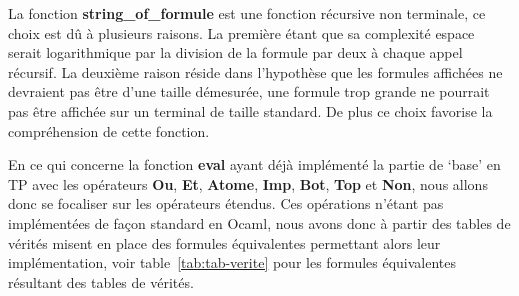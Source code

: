 \documentclass[12pt]{article}
\begin{document}
    \vphantom{}

    La fonction \textbf{string\_of\_formule} est une fonction récursive non 
    terminale, ce choix est dû à plusieurs raisons. La première étant que sa 
    complexité espace serait logarithmique par la division de la formule par 
    deux à chaque appel récursif. La deuxième raison réside dans l'hypothèse que
    les formules affichées ne devraient pas être d'une taille démesurée, une 
    formule trop grande ne pourrait pas être affichée sur un terminal de taille
    standard. De plus ce choix favorise la compréhension de cette fonction.

    \vphantom{}

    En ce qui concerne la fonction \textbf{eval} ayant déjà implémenté la
    partie de `base' en TP avec les opérateurs \textbf{Ou}, \textbf{Et}, 
    \textbf{Atome}, \textbf{Imp}, \textbf{Bot}, \textbf{Top} et \textbf{Non},
    nous allons donc se focaliser sur les opérateurs étendus. Ces opérations 
    n'étant pas implémentées de façon standard en Ocaml, nous avons donc à 
    partir des tables de vérités misent en place des formules équivalentes 
    permettant alors leur implémentation, voir table~\ref{tab:tab-verite} pour 
    les formules équivalentes résultant des tables de vérités.  
\end{document}
